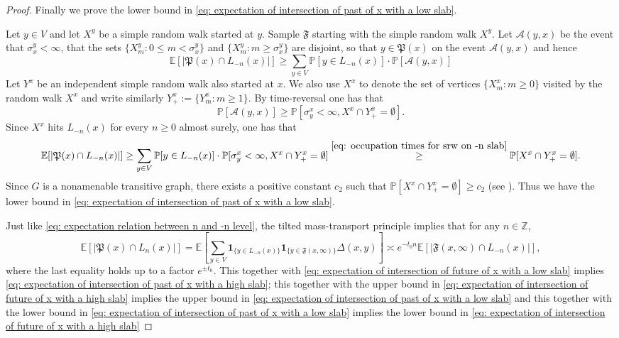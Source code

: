 \documentclass[12pt]{article}
\numberwithin{equation}{section}
\newcommand{\1}{\mathbf{1}}
\begin{document}
\begin{proof}
 	
 	Finally we prove the lower bound in \eqref{eq: expectation of intersection of past of x with a low slab}.
 	
 	
 Let $y\in V$ and let $X^y$ be a simple random walk started at $y$. Sample  $\mathfrak{F}$ starting with the simple random walk $X^y$. Let $\mathscr{A}(y,x)$ be the event that $\sigma_x^y<\infty$, that the sets $\{X^y_m:0\leq m<\sigma_x^y\}$ and $\{X_m^y:m\geq \sigma_x^y \}$ are disjoint, so that $y\in\mathfrak{P}(x)$ on the event $\mathscr{A}(y,x)$ and hence 
 \[
 \mathbb{E}[|\mathfrak{P}(x)\cap L_{-n}(x) |]\geq \sum_{y\in V}\mathbb{P}[ y\in L_{-n}(x)]\cdot \mathbb{P}[\mathscr{A}(y,x)  ]
 \]
 	Let $Y^x$ be an independent simple random walk also started at $x$. We also use $X^x$ to denote the set of vertices $\{X_m^x:m\geq0\}$ visited by the random walk $X^x$ and write similarly $Y^x_+:=\{Y_m^x:m\geq1 \}$. 	By time-reversal one has that 
 	\[
 	\mathbb{P}[\mathscr{A}(y,x)]\geq \mathbb{P}[\sigma_y^x<\infty,X^x\cap Y^x_+=\emptyset].
 	\]
 	Since $X^x$ hits $L_{-n}(x)$ for every $n\geq0$ almost surely, one has that 
 	\[
 	 \mathbb{E}[|\mathfrak{P}(x)\cap L_{-n}(x) |]\geq \sum_{y\in V}\mathbb{P}[ y\in L_{-n}(x)]\cdot \mathbb{P}[\sigma_y^x<\infty,X^x\cap Y^x_+=\emptyset]\stackrel{\eqref{eq: occupation times for srw on -n slab}}{\geq} \mathbb{P}[X^x\cap Y^x_+=\emptyset].
 	\]
 	Since $G$ is a nonamenable transitive graph, there exists a positive constant $
 	c_{2}$ such that $\mathbb{P}[X^x\cap Y^x_+=\emptyset]\geq c_{2}$ (see \cite[Theorem 10.24]{LP2016}). Thus we have the lower bound in \eqref{eq: expectation of intersection of past of x with a low slab}.
 	
 	
 	Just like \eqref{eq: expectation relation between n and -n level}, the tilted mass-transport principle implies that for any $n\in\mathbb{Z}$,
 	\[
 	\mathbb{E}[|\mathfrak{P}(x)\cap L_n(x)|]=\mathbb{E}\left[\sum_{y\in V}\mathbf{1}_{\{ y\in L_{-n}(x)\}} \mathbf{1}_{\{y\in\mathfrak{F}(x,\infty) \}} \Delta(x,y) \right]\asymp
 	e^{-t_0n}\mathbb{E}[|\mathfrak{F}(x,\infty)\cap L_{-n}(x)|],
 	\]
 	where the last equality holds up to a factor $e^{\pm t_0}$.
 	This together with \eqref{eq: expectation of intersection of future of x with a low slab} implies \eqref{eq: expectation of intersection of past of x with a high slab}; this together with the upper bound in \eqref{eq: expectation of intersection of future of x with a high slab} implies the upper bound in \eqref{eq: expectation of intersection of past of x with a low slab} and this together with the lower bound in \eqref{eq: expectation of intersection of past of x with a low slab} implies the lower bound in \eqref{eq: expectation of intersection of future of x with a high slab} 
  \end{proof}
\end{document}
